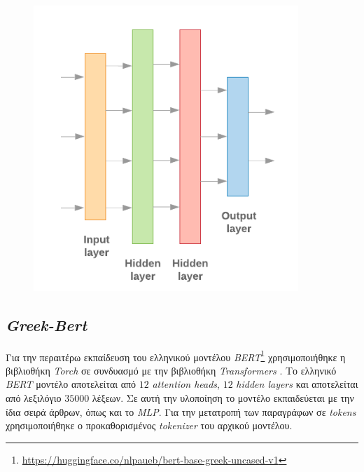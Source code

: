 \begin{figure}[!ht]
  \centering
  \captionsetup{justification=centering}
  \includegraphics[width=10cm]{images/chapter4/mlp-arch.png}
  \label{fig:mlp-arch}
\end{figure}
\noindent

\subsection{\emph{Greek-Bert}}
Για την περαιτέρω εκπαίδευση του ελληνικού μοντέλου \emph{BERT}\footnote{\url{https://huggingface.co/nlpaueb/bert-base-greek-uncased-v1}} χρησιμοποιήθηκε η βιβλιοθήκη \emph{Torch} \cite{torch} σε συνδυασμό με την βιβλιοθήκη \emph{Transformers} \cite{transformers}. Το ελληνικό \emph{BERT} μοντέλο αποτελείται από $12$ \emph{attention heads}, $12$ \emph{hidden layers} και αποτελείται από λεξιλόγιο $35000$ λέξεων. Σε αυτή την υλοποίηση το μοντέλο εκπαιδεύεται με την ίδια σειρά άρθρων, όπως και το \emph{MLP}. Για την μετατροπή των παραγράφων σε \emph{tokens} χρησιμοποιήθηκε ο προκαθορισμένος \emph{tokenizer} του αρχικού μοντέλου.